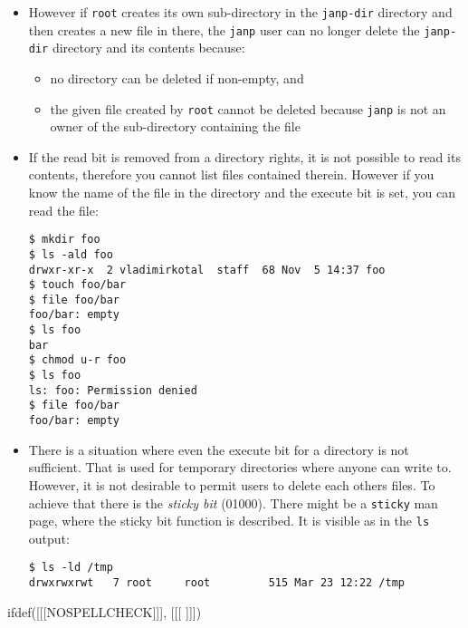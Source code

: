 \begin{itemize}
\item However if \texttt{root} creates its own sub-directory in the
\texttt{janp-dir} directory and then creates a new file in there, the
\texttt{janp} user can no longer delete the \texttt{janp-dir} directory and its
contents because:
\begin{itemize}
\item no directory can be deleted if non-empty, and
\item the given file created by \texttt{root} cannot be deleted because
\texttt{janp} is not an owner of the sub-directory containing the file
\end{itemize}
\item If the read bit is removed from a directory rights, it is not possible to
read its contents, therefore you cannot list files contained therein. However if you
know the name of the file in the directory and the execute bit is set, you can
read the file:
\begin{verbatim}
$ mkdir foo
$ ls -ald foo
drwxr-xr-x  2 vladimirkotal  staff  68 Nov  5 14:37 foo
$ touch foo/bar
$ file foo/bar
foo/bar: empty
$ ls foo
bar
$ chmod u-r foo
$ ls foo
ls: foo: Permission denied
$ file foo/bar
foo/bar: empty
\end{verbatim}
\item There is a situation where even the execute bit for a directory is not
sufficient.  That is used for temporary directories where anyone can write to.
However, it is not desirable to permit users to delete each others files.
To achieve that there is the \emph{sticky bit} (01000).  There might be a
\texttt{sticky} man page, where the sticky bit function is described.
It is visible as \texttt{} in the \texttt{ls} output:

\begin{verbatim}
$ ls -ld /tmp
drwxrwxrwt   7 root     root         515 Mar 23 12:22 /tmp
\end{verbatim}
\end{itemize}


ifdef([[[NOSPELLCHECK]]], [[[
]]])


